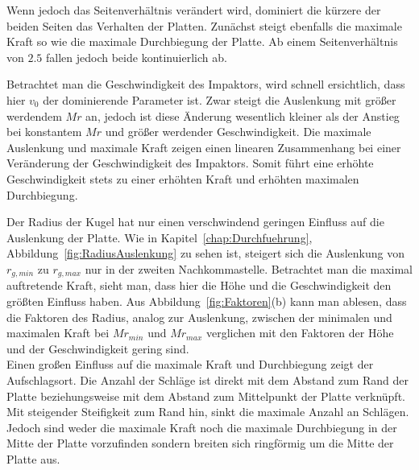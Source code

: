 Wenn jedoch das Seitenverhältnis verändert wird, dominiert die kürzere der beiden Seiten das Verhalten der Platten. Zunächst steigt ebenfalls die maximale Kraft so wie die maximale Durchbiegung der Platte. Ab einem Seitenverhältnis von $2.5$ fallen jedoch beide kontinuierlich ab.

Betrachtet man die Geschwindigkeit des Impaktors, wird schnell ersichtlich, dass hier $v_{0}$ der dominierende Parameter ist. Zwar steigt die Auslenkung mit größer werdendem $Mr$ an, jedoch ist diese Änderung wesentlich kleiner als der Anstieg bei konstantem $Mr$ und größer werdender Geschwindigkeit. Die maximale Auslenkung und maximale Kraft zeigen einen linearen Zusammenhang bei einer Veränderung der Geschwindigkeit des Impaktors. Somit führt eine erhöhte Geschwindigkeit stets zu einer erhöhten Kraft und erhöhten maximalen Durchbiegung.

Der Radius der Kugel hat nur einen verschwindend geringen Einfluss auf die Auslenkung der Platte. Wie in Kapitel~\ref{chap:Durchfuehrung}, Abbildung~\ref{fig:RadiusAuslenkung} zu sehen ist, steigert sich die Auslenkung von $r_{g,min}$ zu $r_{g,max}$ nur in der zweiten Nachkommastelle.
Betrachtet man die maximal auftretende Kraft, sieht man, dass hier die Höhe und die Geschwindigkeit den größten Einfluss haben. Aus Abbildung~\ref{fig:Faktoren}(b) kann man ablesen, dass die Faktoren des Radius, analog zur Auslenkung, zwischen der minimalen und maximalen Kraft bei $Mr_{min}$ und $Mr_{max}$ verglichen mit den Faktoren der Höhe und der Geschwindigkeit gering sind. \\

Einen großen Einfluss auf die maximale Kraft und Durchbiegung zeigt der Aufschlagsort.
Die Anzahl der Schläge ist direkt mit dem Abstand zum Rand der Platte beziehungsweise mit dem Abstand zum Mittelpunkt der Platte verknüpft. Mit steigender Steifigkeit zum Rand hin, sinkt die maximale Anzahl an Schlägen. Jedoch sind weder die maximale Kraft noch die maximale Durchbiegung in der Mitte der Platte vorzufinden sondern breiten sich ringförmig um die Mitte der Platte aus.


